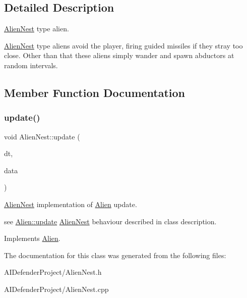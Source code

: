 \subsection{Detailed Description}
\hyperlink{class_alien_nest}{Alien\+Nest} type alien. 

\hyperlink{class_alien_nest}{Alien\+Nest} type aliens avoid the player, firing guided missiles if they stray too close. Other than that these aliens simply wander and spawn abductors at random intervals. 

\subsection{Member Function Documentation}
\mbox{\label{class_alien_nest_ac8d9fe5e35a8a049ae0be1b4f32bd403}} 
\subsubsection{\texorpdfstring{update()}{update()}}
{\footnotesize\ttfamily void Alien\+Nest\+::update (\begin{DoxyParamCaption}\item[{float}]{dt,  }\item[{\hyperlink{class_alien_manager}{Alien\+Manager} $\ast$}]{data }\end{DoxyParamCaption})\hspace{0.3cm}{\ttfamily [virtual]}}



\hyperlink{class_alien_nest}{Alien\+Nest} implementation of \hyperlink{class_alien}{Alien} update. 

see \hyperlink{class_alien_afdf9627be2ad37372174a250540dd47b}{Alien\+::update} \hyperlink{class_alien_nest}{Alien\+Nest} behaviour described in class description. 

Implements \hyperlink{class_alien_afdf9627be2ad37372174a250540dd47b}{Alien}.



The documentation for this class was generated from the following files\+:\begin{DoxyCompactItemize}
\item 
A\+I\+Defender\+Project/Alien\+Nest.\+h\item 
A\+I\+Defender\+Project/Alien\+Nest.\+cpp\end{DoxyCompactItemize}
